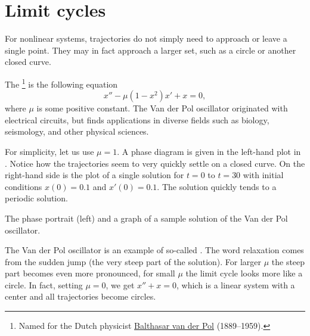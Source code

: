 \section{Limit cycles}
\label{limitcycles:section}



For nonlinear systems, trajectories do
not simply need to approach or leave a single point.  They may in fact approach a
larger set, such as a circle or another closed curve.

\begin{example}
The \emph{}\footnote{Named for the
Dutch physicist 
\href{https://en.wikipedia.org/wiki/Balthasar_van_der_Pol}{Balthasar van der
Pol} (1889--1959).}
is the following equation
\begin{equation*}
x''-\mu(1-x^2) x' + x = 0,
\end{equation*}
where $\mu$ is some positive constant.  The Van der Pol oscillator
originated with electrical circuits, but finds applications
in diverse fields such as biology, seismology, and
other physical sciences.

For simplicity, let us use $\mu = 1$.  A
phase diagram is given in the left-hand plot in
.  Notice how the
trajectories seem to very quickly settle on a closed curve.  On the
right-hand side is the plot of a single solution for $t=0$ to $t=30$ with
initial conditions $x(0) = 0.1$ and $x'(0) = 0.1$.  The solution
quickly tends to a periodic solution.
\begin{myfig}
\capstart
\caption{The phase portrait (left) and a graph of a sample solution
of the Van der Pol oscillator.\label{fig:nlin-van-der-fig}}
\end{myfig}

The Van der Pol oscillator is an 
example of so-called \emph{}.  The word
relaxation comes from the sudden jump (the very steep part of the solution).
For larger $\mu$ the steep part becomes even more pronounced, for small $\mu$ 
the limit cycle looks more like a circle.  In fact, setting
$\mu = 0$, we get $x''+x=0$, which is a linear system with a
center and all trajectories become circles.
\end{example}

